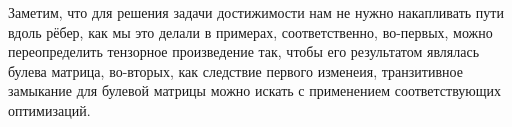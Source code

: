 Заметим, что для решения задачи достижимости нам не нужно накапливать пути вдоль рёбер, как мы это делали в примерах, соответственно, во-первых, можно переопределить тензорное произведение так, чтобы его результатом являлась булева матрица, во-вторых, как следствие первого изменеия, транзитивное замыкание для булевой матрицы можно искать с применением соответствующих оптимизаций.

%
